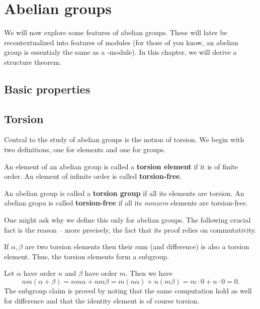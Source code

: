 \chapter{Abelian groups}

We will now explore some features of abelian groups. These will later be
recontextualized into features of modules (for those of you know, an abelian
group is essentialy the same as a -module). In this chapter, we will
derive a structure theorem.

\section{Basic properties}


\section{Torsion}

Central to the study of abelian groups is the notion of torsion. We begin with~
two definitions, one for elements and one for groups.

\begin{defn}
    An element of an abelian group is called a \textbf{torsion element} if it is
    of finite order. An element of infinite order is called \textbf{torsion-free}.
\end{defn}

\begin{defn}
    An abelian group is called a \textbf{torsion group} if all its elements are torsion.
    An abelian gropu is called \textbf{torsion-free} if all its \emph{nonzero} elements
    are torsion-free.
\end{defn}

One might ask why we define this only for abelian groups. The following crucial fact
is the reason -- more precisely, the fact that its proof relies on commutativity.

\begin{thm}
    If \( \alpha, \beta \) are two torsion elements then their sum (and difference)
    is also a torsion element. Thus, the torsion elements form a subgroup.
\end{thm}

\begin{Proof}
Let \( \alpha \) have order \( n \) and \( \beta \) have order \( m \). Then we have
\[ 
    nm(\alpha + \beta) = nm\alpha + nm\beta =  m(n\alpha) + n(m\beta) = m \cdot 0 + n \cdot 0 = 0.
\]
The subgroup claim is proved by noting that the same computation hold as well
for difference and that the identity element is of course torsion.
\end{Proof}

